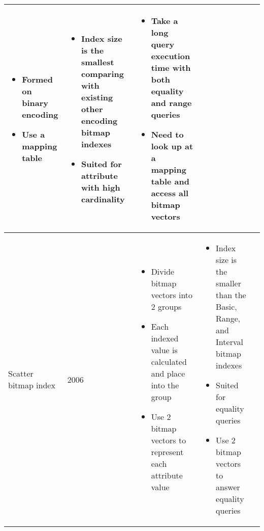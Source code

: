 \documentclass[../main/thesis.tex]{subfiles}
\begin{document}
\begin{landscape}
\begin{longtable}{K{0.12\textwidth}K{0.06\textwidth}K{0.42\textwidth}K{0.42\textwidth}K{0.42\textwidth}}
\begin{minipage}[t]{0.42\textwidth}
			\begin{itemize}[label=-, leftmargin=0.5cm, noitemsep]
				\item Formed on binary encoding
				\item Use a mapping table
			\end{itemize}
		\end{minipage} &
		\begin{minipage}[t]{0.42\textwidth}
			\begin{itemize}[label=-, leftmargin=0.5cm, noitemsep]
				\item Index size is the smallest comparing with existing other encoding bitmap indexes
				\item Suited for attribute with high cardinality
			\end{itemize}
		\end{minipage} &
		\begin{minipage}[t]{0.42\textwidth}
			\begin{itemize}[label=-, leftmargin=0.5cm, noitemsep]
				\item Take a long query execution time with both equality and range queries
				\item Need to look up at a mapping table and access all bitmap vectors
			\end{itemize}
		\end{minipage} \\
		\hline
		Scatter bitmap index \cite{ScatterBI} & 2006 & 
		\begin{minipage}[t]{0.42\textwidth}
			\begin{itemize}[label=-, leftmargin=0.5cm, noitemsep]
				\item Divide bitmap vectors into 2 groups
				\item Each indexed value is calculated and place into the group
				\item Use 2 bitmap vectors to represent each attribute value
			\end{itemize}
		\end{minipage} &
		\begin{minipage}[t]{0.42\textwidth}
			\begin{itemize}[label=-, leftmargin=0.5cm, noitemsep]
				\item Index size is the smaller than the Basic, Range, and Interval bitmap indexes
				\item Suited for equality queries
				\item Use 2 bitmap vectors to answer equality queries
			\end{itemize}

\end{minipage}
\end{longtable}
\end{landscape}
\end{document}
